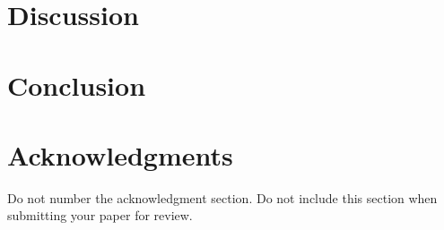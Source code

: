 \documentclass[11pt]{article}
\begin{document}
\section{Discussion}
\section{Conclusion}
\section*{Acknowledgments}

Do not number the acknowledgment section. Do not include this section when submitting your paper for review.



\end{document}
